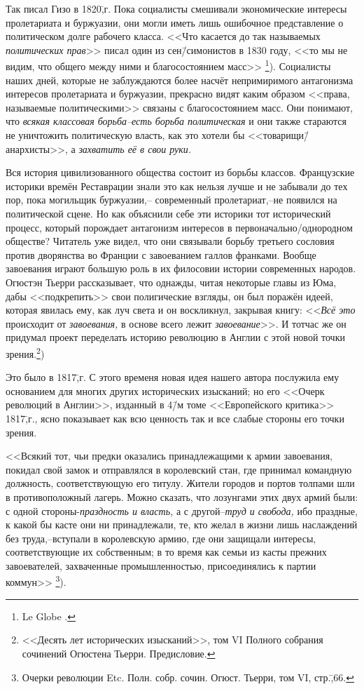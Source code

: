 Так писал Гизо в 1820\=,г. Пока социалисты смешивали экономические интересы пролетариата и буржуазии, они могли иметь лишь ошибочное представление о политическом долге рабочего класса. <<Что касается до так называемых \emph{политических прав}>> писал один из сен\=/симонистов в 1830 году, <<то мы не видим, что общего между ними и благосостоянием масс>> \footnote{Le Globe .}). Социалисты наших дней, которые не заблуждаются более насчёт непримиримого антагонизма интересов пролетариата и буржуазии, прекрасно видят каким образом <<права, называемые политическими>> связаны с благосостоянием масс. Они понимают, что \emph{всякая классовая борьба\---есть борьба политическая} и они также стараются не уничтожить политическую власть, как это хотели бы <<товарищи\=/анархисты>>, а \emph{захватить её в свои руки.}

Вся история цивилизованного общества состоит из борьбы классов. Французские историки времён Реставрации знали это как нельзя лучше и не забывали до тех пор, пока могильщик буржуазии,\--- современный пролетариат,\---не появился на политической сцене. Но как объяснили себе эти историки тот исторический процесс, который порождает антагонизм интересов в первоначально\-/однородном обществе? Читатель уже видел, что они связывали борьбу третьего сословия против дворянства во Франции с завоеванием галлов франками. Вообще завоевания играют большую роль в их филосовии истории современных народов. Огюстэн Тьерри рассказывает, что однажды, читая некоторые главы из Юма, дабы <<подкрепить>> свои полигические взгляды, он был поражён идеей, которая явилась ему, как луч света и он воскликнул, закрывая книгу: <<\emph{Всё это} происходит от \emph{завоевания,} в основе всего лежит \emph{завоевание}>>. И тотчас же он придумал проект переделать историю революцию в Англии с этой новой точки зрения.\footnote{<<Десять лет исторических изысканий>>, том VI Полного собрания сочинений Огюстена Тьерри. Предисловие.})

Это было в 1817\=,г. С этого временя новая идея нашего автора послужила ему основанием для многих других исторических изысканий; но его <<Очерк революций в Англии>>, изданный в 4\=/м томе <<Европейского критика>> 1817\=,г., ясно показывает как всю ценность так и все слабые стороны его точки зрения.

<<Всякий тот, чьи предки оказались принадлежащими к армии завоевания, покидал свой замок и отправлялся в королевский стан, где принимал командную должность, соответствующую его титулу. Жители городов и портов толпами шли в противоположный лагерь. Можно сказать, что лозунгами этих двух армий были: с одной стороны\--\emph{праздность и власть,} а с другой\---\emph{труд и свобода,} ибо праздные, к какой бы касте они ни принадлежали, те, кто желал в жизни лишь наслаждений без труда,\---вступали в королевскую армию, где они защищали интересы, соответствующие их собственным; в то время как семьи из касты прежних завоевателей, захваченные промышленностью, присоединялись к партии коммун>> \footnote{Очерки революции Etc. Полн. собр. сочин. Огюст. Тьерри, том VI, стр.\=,66.}).

